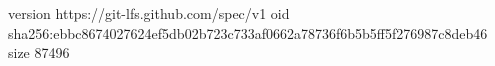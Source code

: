 version https://git-lfs.github.com/spec/v1
oid sha256:ebbc8674027624ef5db02b723c733af0662a78736f6b5b5ff5f276987c8deb46
size 87496
